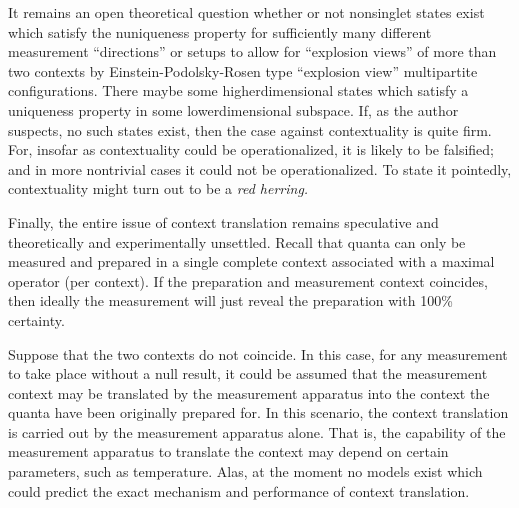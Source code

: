 \documentclass{aipproc}
\begin{document}
It remains an open theoretical question whether or not
nonsinglet states exist which satisfy the nuniqueness property for sufficiently many
different measurement ``directions'' or setups to allow for
``explosion views'' of more than two contexts by Einstein-Podolsky-Rosen type ``explosion view''
multipartite configurations.
There maybe some higherdimensional states which satisfy a uniqueness property in some lowerdimensional subspace.
If, as the author suspects, no such states exist,
then the case against contextuality is quite firm.
For, insofar as contextuality could be operationalized, it is likely to be falsified;
and in more nontrivial cases it could not be operationalized.
To state it pointedly, contextuality might turn out to be a {\em red herring.}

Finally, the entire issue of context translation remains speculative and
theoretically and experimentally unsettled.
Recall that quanta can only be measured and prepared in a single complete context associated
with a  maximal operator (per context).
If the preparation and measurement context coincides,
then ideally the measurement will just reveal the preparation with 100\%
certainty.

Suppose that the two contexts do not coincide.
In this case, for any measurement to take place without a null result,
it could be assumed that the measurement context
may be translated by the measurement apparatus
into the context the quanta have been originally prepared for.
In this scenario, the context translation is carried out by the measurement apparatus alone.
That is, the capability of the measurement apparatus to translate the context
may depend on certain parameters, such as temperature.
Alas, at the moment no models exist which could predict the exact mechanism and
performance of context translation.

%
%
\end{document}
